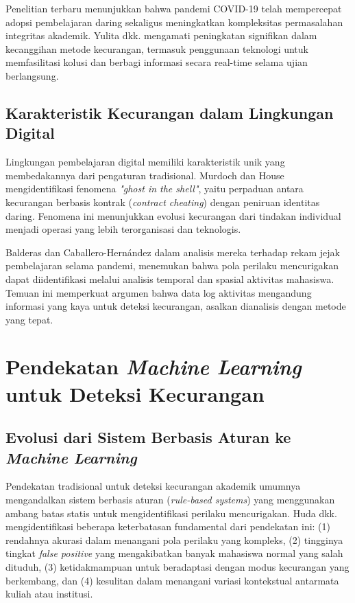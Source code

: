 Penelitian terbaru menunjukkan bahwa pandemi COVID-19 telah mempercepat adopsi pembelajaran daring sekaligus meningkatkan kompleksitas permasalahan integritas akademik. Yulita dkk. \cite{Yulita2023} mengamati peningkatan signifikan dalam kecanggihan metode kecurangan, termasuk penggunaan teknologi untuk memfasilitasi kolusi dan berbagi informasi secara real-time selama ujian berlangsung.

\subsection{Karakteristik Kecurangan dalam Lingkungan Digital}

Lingkungan pembelajaran digital memiliki karakteristik unik yang membedakannya dari pengaturan tradisional. Murdoch dan House \cite{Murdoch2019} mengidentifikasi fenomena \textit{"ghost in the shell"}, yaitu perpaduan antara kecurangan berbasis kontrak (\textit{contract cheating}) dengan peniruan identitas daring. Fenomena ini menunjukkan evolusi kecurangan dari tindakan individual menjadi operasi yang lebih terorganisasi dan teknologis.

Balderas dan Caballero-Hern\'{a}ndez \cite{Balderas2020} dalam analisis mereka terhadap rekam jejak pembelajaran selama pandemi, menemukan bahwa pola perilaku mencurigakan dapat diidentifikasi melalui analisis temporal dan spasial aktivitas mahasiswa. Temuan ini memperkuat argumen bahwa data log aktivitas mengandung informasi yang kaya untuk deteksi kecurangan, asalkan dianalisis dengan metode yang tepat.

\section{Pendekatan \textit{Machine Learning} untuk Deteksi Kecurangan}
\label{sec:mlApproaches}

\subsection{Evolusi dari Sistem Berbasis Aturan ke \textit{Machine Learning}}

Pendekatan tradisional untuk deteksi kecurangan akademik umumnya mengandalkan sistem berbasis aturan (\textit{rule-based systems}) yang menggunakan ambang batas statis untuk mengidentifikasi perilaku mencurigakan. Huda dkk. \cite{article:rule_based_limitations} mengidentifikasi beberapa keterbatasan fundamental dari pendekatan ini: (1) rendahnya akurasi dalam menangani pola perilaku yang kompleks, (2) tingginya tingkat \textit{false positive} yang mengakibatkan banyak mahasiswa normal yang salah dituduh, (3) ketidakmampuan untuk beradaptasi dengan modus kecurangan yang berkembang, dan (4) kesulitan dalam menangani variasi kontekstual antarmata kuliah atau institusi.

